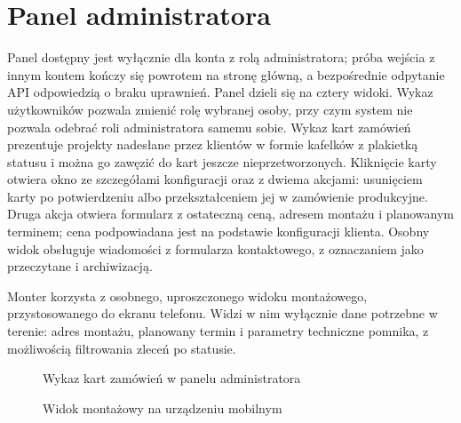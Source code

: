 \section{Panel administratora}
\label{sec:prez-panel}

Panel dostępny jest wyłącznie dla konta z rolą administratora; próba wejścia z innym kontem kończy się powrotem na stronę główną, a bezpośrednie odpytanie API odpowiedzią o braku uprawnień. Panel dzieli się na cztery widoki. Wykaz użytkowników pozwala zmienić rolę wybranej osoby, przy czym system nie pozwala odebrać roli administratora samemu sobie. Wykaz kart zamówień prezentuje projekty nadesłane przez klientów w formie kafelków z plakietką statusu i można go zawęzić do kart jeszcze nieprzetworzonych. Kliknięcie karty otwiera okno ze szczegółami konfiguracji oraz z dwiema akcjami: usunięciem karty po potwierdzeniu albo przekształceniem jej w zamówienie produkcyjne. Druga akcja otwiera formularz z ostateczną ceną, adresem montażu i planowanym terminem; cena podpowiadana jest na podstawie konfiguracji klienta. Osobny widok obsługuje wiadomości z formularza kontaktowego, z oznaczaniem jako przeczytane i archiwizacją.

Monter korzysta z osobnego, uproszczonego widoku montażowego, przystosowanego do ekranu telefonu. Widzi w nim wyłącznie dane potrzebne w terenie: adres montażu, planowany termin i parametry techniczne pomnika, z możliwością filtrowania zleceń po statusie.

\begin{figure}[htbp]
\centering
\caption{Wykaz kart zamówień w panelu administratora}
\label{fig:prez-panel-karty}
\end{figure}

\begin{figure}[htbp]
\centering
\caption{Widok montażowy na urządzeniu mobilnym}
\label{fig:prez-widok-montazowy}
\end{figure}
